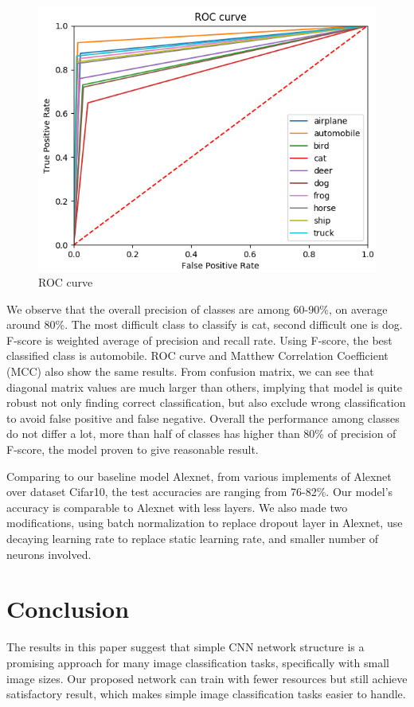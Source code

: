 \documentclass[journal,onecolumn, 12pt]{IEEEtran}
\begin{document}
\begin{figure}[!t]
\includegraphics[width=0.4\paperwidth]{images/roc}
\caption{ROC curve}
\end{figure}


We observe that the overall precision of classes are among 60-90\%, on average around 80\%. The most difficult class to classify is cat, second difficult one is dog. F-score is weighted average of precision and recall rate. Using F-score, the best classified class is automobile. ROC curve and Matthew Correlation Coefficient (MCC) also show the same results. From confusion matrix, we can see that diagonal matrix values are much larger than others, implying that model is quite robust not only finding correct classification, but also exclude wrong classification to avoid false positive and false negative. Overall the performance among classes do not differ a lot, more than half of classes has higher than 80\% of precision of F-score, the model proven to give reasonable result.

Comparing to our baseline model Alexnet, from various implements of Alexnet over dataset Cifar10, the test accuracies are ranging from 76-82\%. \cite{alex1, alex2} Our model’s accuracy is comparable to Alexnet with less layers. We also made two modifications, using batch normalization to replace dropout layer in Alexnet, use decaying learning rate to replace static learning rate, and smaller number of neurons involved.


\section{Conclusion}
The results in this paper suggest that simple CNN network structure is a promising approach for many image classification tasks, specifically with small image sizes. Our proposed network can train with fewer resources but still achieve satisfactory result, which makes simple image classification tasks easier to handle.
\end{document}
